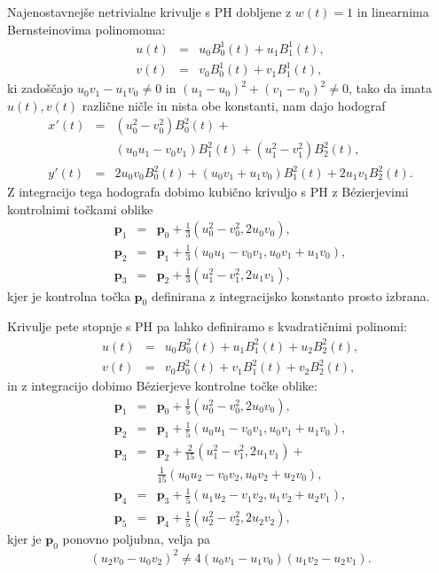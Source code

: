 \documentclass[a4paper]{IEEEtran}
\begin{document}
	Najenostavnejše netrivialne krivulje s PH dobljene z $w (t) = 1$ in linearnima Bernsteinovima polinomoma:
	\begin{eqnarray}
	u (t) &=& u_0 B^1_0(t) + u_1 B^1_1(t),\nonumber\\
	v (t) &=& v_0 B^1_0(t) + v_1 B^1_1(t),\nonumber
	\end{eqnarray}
	ki zadoščajo $u_0v_1 - u_1v_0\not = 0$ in $(u_1 - u_0)^2+ (v_1 - v_0)^2\not = 0$, tako da imata $u (t), v (t)$ različne ničle in nista obe konstanti, nam dajo hodograf
	\begin{eqnarray}
	x\prime (t) &=& (u^2_0- v^2_0)B^2_0(t) +\nonumber\\
	& & (u_0u_1-v_0v_1)B^2_1(t)+(u^2_1-v^2_1)B^2_2(t),\nonumber\\
	y\prime(t) &=& 2u_0v_0B^2_0(t)+(u_0v_1+u_1v_0)B^2_1(t)+2u_1v_1B^2_2(t).\nonumber
	\end{eqnarray}
	Z integracijo tega hodografa dobimo kubično krivuljo s PH z B\'ezierjevimi kontrolnimi točkami oblike
	\begin{eqnarray}
	\textbf{p}_1 &=& \textbf{p}_0 + \frac{1}{3}(u_0^2-v_0^2,2u_0v_0),\nonumber\\
	\textbf{p}_2 &=& \textbf{p}_1 + \frac{1}{3}(u_0u_1-v_0v_1,u_0v_1+u_1v_0),\nonumber\\
	\textbf{p}_3 &=& \textbf{p}_2 + \frac{1}{3}(u_1^2-v_1^2,2u_1v_1),\nonumber
	\end{eqnarray}
	kjer je kontrolna točka $\textbf{p}_0$ definirana z integracijsko konstanto prosto izbrana.
	
	Krivulje pete stopnje s PH pa lahko definiramo s kvadratičnimi polinomi:
	\begin{eqnarray}
	u(t) &=& u_0B_0^2(t)+u_1B_1^2(t)+u_2B_2^2(t),\nonumber\\
	v(t)&=&v_0B_0^2(t)+v_1B_1^2(t)+v_2B_2^2(t),\nonumber
	\end{eqnarray}
	in z integracijo dobimo B\'ezierjeve kontrolne točke oblike:
	\begin{eqnarray}
	\textbf{p}_1 &=& \textbf{p}_0 + \frac{1}{5}(u_0^2-v_0^2,2u_0v_0),\nonumber\\
	\textbf{p}_2 &=& \textbf{p}_1 + \frac{1}{5}(u_0u_1-v_0v_1,u_0v_1+u_1v_0),\nonumber\\
	\textbf{p}_3 &=& \textbf{p}_2 + \frac{2}{15}(u_1^2-v_1^2,2u_1v_1)+\nonumber\\
	& & \frac{1}{15}(u_0u_2-v_0v_2,u_0v_2+u_2v_0),\nonumber\\
	\textbf{p}_4 &=& \textbf{p}_3 + \frac{1}{5}(u_1u_2-v_1v_2,u_1v_2+u_2v_1),\nonumber\\
	\textbf{p}_5 &=& \textbf{p}_4 + \frac{1}{5}(u_2^2-v_2^2,2u_2v_2),\nonumber
	\end{eqnarray}
	kjer je $\textbf{p}_0$ ponovno poljubna, velja pa
	$$(u_2v_0-u_0v_2)^2\not=4(u_0v_1-u_1v_0)(u_1v_2-u_2v_1).$$
	
\end{document}
